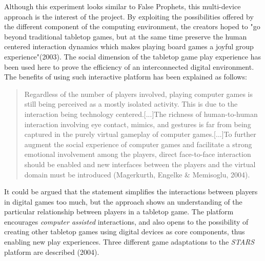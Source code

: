 Although this experiment looks similar to False Prophets, this multi-device approach is the interest of the project. By exploiting the possibilities offered by the different component of the computing environment, the creators hoped to "go beyond traditional tabletop games, but at the same time preserve the human centered interaction dynamics which makes playing board games a joyful group experience"(2003)\cite{art:stars}. The social dimension of the tabletop game play experience has been used here to prove the efficiency of an interconnected digital environment. The benefits of using such interactive platform has been explained as follows:

\begin{quotation}
Regardless of the number of players involved, playing computer games is still being perceived as a mostly isolated activity. This is due to the interaction being technology centered.[...]The richness of human-to-human interaction
involving eye contact, mimics, and gestures is far from being captured in the purely virtual gameplay of computer games.[...]To further augment the social experience of computer games and facilitate a strong emotional involvement among the players, direct face-to-face interaction should be enabled and new interfaces between the players and the virtual domain must be introduced (Magerkurth, Engelke \& Memisoglu, 2004)\cite{art:stars2}.
\end{quotation}

It could be argued that the statement simplifies the interactions between players in digital games too much, but the approach shows an understanding of the particular relationship between players in a tabletop game. The platform encourages \textit{computer assisted} interactions, and also opens to the possibility of creating other tabletop games using digital devices as core components, thus enabling new play experiences. Three different game adaptations to the \textit{STARS} platform are described (2004)\cite{art:stars2}.


